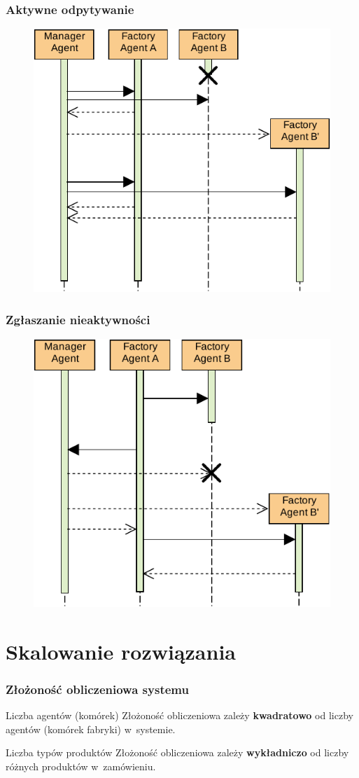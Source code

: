 \documentclass{beamer}
\begin{document}
\begin{frame}
    \frametitle{Aktywne odpytywanie}
    \begin{figure}
        \centering
        \includegraphics[width=0.65\columnwidth]{figures/SAG-Pingowanie.pdf}
        \label{fig:factory-fsm}
    \end{figure}
\end{frame}

\begin{frame}
    \frametitle{Zgłaszanie nieaktywności}
    \begin{figure}
        \centering
        \includegraphics[width=0.65\columnwidth]{figures/SAG-Kablowanie.pdf}
        \label{fig:factory-fsm}
    \end{figure}
\end{frame}

\section{Skalowanie rozwiązania}
\begin{frame}
    \frametitle{Złożoność obliczeniowa systemu}
    \begin{block}{Liczba agentów (komórek)}
        Złożoność obliczeniowa zależy \textbf{kwadratowo} od liczby agentów (komórek fabryki) w~systemie.  
    \end{block}
    \bigskip
    \begin{block}{Liczba typów produktów}
        Złożoność obliczeniowa zależy \textbf{wykładniczo} od liczby różnych produktów w~zamówieniu.  
    \end{block}
\end{frame}
\end{document}
